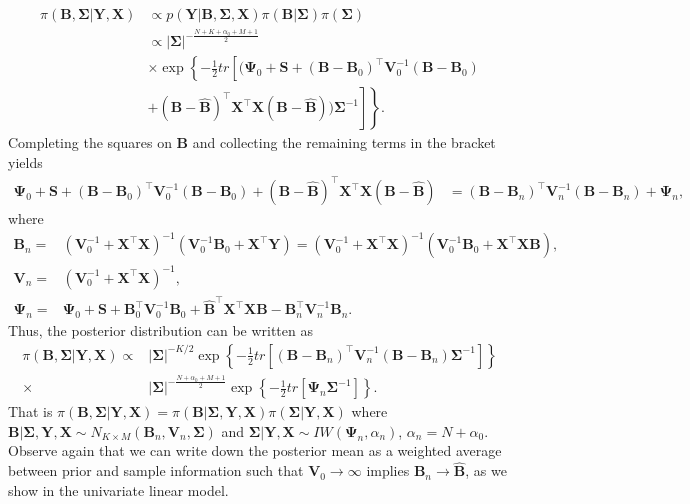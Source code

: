 \begin{align*}
	\pi({\bm{B}},{\bm{\Sigma}}|{\bm{Y}},{\bm{X}})&\propto  p({\bm{Y}}|{\bm{B}},{\bm{\Sigma}},{\bm{X}}) \pi({\bm{B}}| {\bm \Sigma})\pi({\bm{\Sigma}})\\
	&\propto \left|{\bm{\Sigma}} \right|^{-\frac{N+K+\alpha_{0}+M+1}{2}}\\
	&\times\exp\left\lbrace -\frac{1}{2}tr\left[(\bm{\Psi}_{0}+{\bm{S}} +({\bm{B}}-{\bm{B}}_{0})^{\top}{\bm{V}}_{0}^{-1}({\bm{B}}-{\bm{B}}_{0})\right.\right.\\
	&\left.\left.   +({\bm{B}}-\widehat{\bm{B}})^{\top}{\bm{X}}^{\top}{\bm{X}}({\bm{B}}-\widehat{\bm{B}}))\bm{\Sigma}^{-1}\right]\right\rbrace .
\end{align*}
Completing the squares on ${\bm{B}}$ and collecting the remaining terms in the bracket yields
{\footnotesize{
\begin{align*}
	{\bm{\Psi}}_{0}+{\bm{S}} +({\bm{B}}-{\bm{B}}_{0})^{\top}{\bm{V}}_{0}^{-1}({\bm{B}}-{\bm{B}}_{0})+({\bm{B}}-\widehat{\bm{B}})^{\top}{\bm{X}}^{\top}{\bm{X}}({\bm{B}}-\widehat{\bm{B}})
	& = ({\bm{B}}-{\bm{B}}_n)^{\top}{\bm{V}}_n^{-1}({\bm{B}}-{\bm{B}}_n)+{\bm{\Psi}}_n,
\end{align*}
}}
where 
\begin{align*}
	{\bm{B}}_n = &({\bm{V}}_{0}^{-1}+{\bm{X}}^{\top}{\bm{X}})^{-1}({\bm{V}}_{0}^{-1}{\bm{B}}_{0}+{\bm{X}}^{\top}{\bm{Y}})=({\bm{V}}_{0}^{-1}+{\bm{X}}^{\top}{\bm{X}})^{-1}({\bm{V}}_{0}^{-1}{\bm{B}}_{0}+{\bm{X}}^{\top}{\bm{X}}\widehat{\bm{B}}),\\
	{\bm{V}}_n = &({\bm{V}}_{0}^{-1}+{\bm{X}}^{\top}{\bm{X}})^{-1},\\
	{\bm{\Psi}}_n= &{\bm{\Psi}}_{0}+{\bm{S}}+{\bm{B}}_{0}^{\top}{\bm{V}}_{0}^{-1}{\bm{B}}_{0}+\widehat{\bm{B}}^{\top}{\bm{X}}^{\top}{\bm{X}}\widehat{\bm{B}}-{\bm{B}}_n^{\top}{\bm{V}}_n^{-1}{\bm{B}}_n.
\end{align*}
Thus, the posterior distribution can be written as
\begin{align*}
	\pi({\bm{B}},{\bm \Sigma}| {\bm{Y}}, {\bm{X}})\propto &\left|{\bm \Sigma} \right|^{-K/2}\exp\left\lbrace -\frac{1}{2} tr\left[({\bm{B}}-{\bm{B}}_n)^{\top}{\bm{V}}_n^{-1}({\bm{B}}-{\bm{B}}_n)   {\bm \Sigma}^{-1}\right]\right\rbrace \\
	\times & \left|{\bm \Sigma} \right|^{-\frac{N+\alpha_{0}+M+1}{2}}\exp\left\lbrace -\frac{1}{2} tr \left[ {\bm{\Psi}}_n{\bm \Sigma}^{-1}\right] \right\rbrace .
\end{align*}
That is $\pi({\bm{B}},{\bm \Sigma}| {\bm{Y}}, {\bm{X}})=\pi ({\bm{B}}| {\bm \Sigma},{\bm{Y}},{\bm{X}})\pi({\bm \Sigma}| {\bm{Y}},{\bm{X}})$ where ${\bm{B}}| {\bm \Sigma},{\bm{Y}}, {\bm{X}} \sim N_{K\times M}({\bm{B}}_n,{\bm{V}}_n,{\bm \Sigma})$ and ${\bm \Sigma}| {\bm{Y}},{\bm{X}} \sim IW({\bm{\Psi}}_n,{\alpha}_n)$, $\alpha_n= N+\alpha_{0}$. Observe again that we can write down the posterior mean as a weighted average between prior and sample information such that ${\bm{V}}_0\rightarrow\infty$ implies ${\bm{B}}_n\rightarrow\hat{{\bm{B}}}$, as we show in the univariate linear model.

